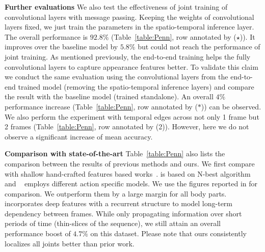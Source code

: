 \documentclass[10pt,twocolumn,letterpaper]{article}
\begin{document}
\noindent\textbf{Further evaluations}
We also test the effectiveness of joint training of convolutional layers with message passing. Keeping the weights of convolutional layers fixed, we just train the parameters in the spatio-temporal inference layer. The overall performance is $92.8\%$ (Table~\ref{table:Penn}, row annotated by ($\star$)). It improves over the baseline model by $5.8\%$ but could not reach the performance of joint training.
As mentioned previously, the end-to-end training helps the fully convolutional layers to capture appearance features better. To validate this claim we conduct the same evaluation using the convolutional layers from the end-to-end trained model (removing the spatio-temporal inference layers) and compare the result with the baseline model (trained standalone). An overall $4\%$ performance increase (Table~\ref{table:Penn}, row annotated by ($\ast$)) can be observed.
We also perform the experiment with temporal edges across not only 1 frame but 2 frames (Table~\ref{table:Penn}, row annotated by (2)). However, here we do not observe a significant increase of mean accuracy.

\noindent\textbf{Comparison with state-of-the-art}
Table~\ref{table:Penn} also lists the comparison between the results of
previous methods and ours. We first compare with shallow hand-crafted features based works~\cite{xiaohan2015joint,park2011n}. \cite{park2011n} is based on N-best algorithm and ~\cite{xiaohan2015joint} employs different action specific models. We use the figures reported in \cite{xiaohan2015joint} for comparison. We outperform them by a large margin for all body parts. \cite{gkioxari2016chained} incorporates deep features with a recurrent structure to model long-term dependency between frames. While only propagating information over short periods of time (thin-slices of the sequence), we still attain an overall performance boost of $4.7\%$ on this dataset. Please note that ours consistently localizes all joints better than prior work.
\end{document}
